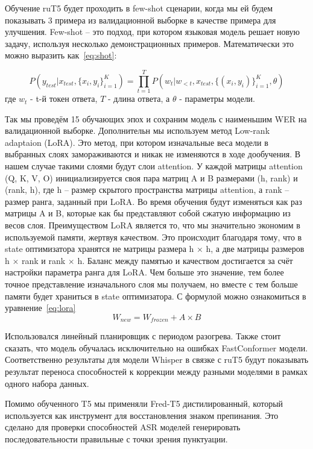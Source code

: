 Обучение ruT5 будет проходить в few-shot сценарии, когда мы ей будем показывать 3 примера из валидационной выборке в качестве примера для улучшения.
Few-shot -- это подход, при котором языковая модель решает новую задачу, используя несколько демонстрационных примеров.
Математически это можно выразить как~\ref{eq:shot}:

\begin{equation}
  P(y_{test}|x_{test},\{x_i,y_i\}^K_{i=1}) = \prod_{t=1}^{T}P(w_t|w_{<t},x_{test},\{(x_i,y_i)\}^K_{i=1},\theta)
  \label{eq:shot}
\end{equation}
где $w_t$ - t-й токен ответа, $T$ - длина ответа, а $\theta$ - параметры модели.

Так мы проведём 15 обучающих эпох и сохраним модель с наименьшим WER на валидационной выборке.
Дополнительн мы используем метод Low-rank adaptaion (LoRA).
Это метод, при котором изначальные веса модели в выбранных слоях замораживаются и никак не изменяются в ходе дообучения.
В нашем случае такими слоями будут слои attention.
У каждой матрицы attention (Q, K, V, O) инициализируется своя пара матриц A и B размерами (h, rank) и (rank, h), где h – размер скрытого пространства матрицы attention, а rank – размер ранга, заданный при LoRA.
Во время обучения будут изменяться как раз матрицы A и B, которые как бы представляют собой сжатую информацию из весов слоя.
Преимуществом LoRA является то, что мы значительно экономим в используемой памяти, жертвуя качеством.
Это происходит благодаря тому, что в state оптимизатора хранятся не матрицы размера h $\times$ h, а две матрицы размеров h $\times$ rank и rank $\times$ h.
Баланс между памятью и качеством достигается за счёт настройки параметра ранга для LoRA.
Чем больше это значение, тем более точное представление изначального слоя мы получаем, но вместе с тем больше памяти будет храниться в state оптимизатора.
С формулой можно ознакомиться в уравнение~\ref{eq:lora}
\begin{equation}
  W_{new} = W_{frozen} + A \times B
  \label{eq:lora}
\end{equation}

Использовался линейный планировщик с периодом разогрева.
Также стоит сказать, что модель обучалась исключительно на ошибках FastConformer модели.
Соответственно результаты для модели Whisper в связке с ruT5 будут показывать результат переноса способностей к коррекции между разными моделями в рамках одного набора данных.

Помимо обученного T5 мы применяли Fred-T5 дистилированный, который используется как инструмент для восстановления знаком препинания.
Это сделано для проверки способностей ASR моделей генерировать последовательности правильные с точки зрения пунктуации.

